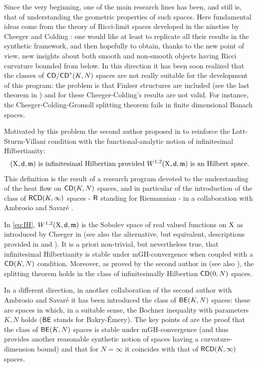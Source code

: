 \documentclass[reqno,11pt]{article}
\numberwithin{equation}{section}
\newcommand{\mm}{{\mbox{\boldmath$m$}}}
\newcommand{\sfd}{{\sf d}}
\renewcommand{\mm}{\mathfrak m}                                %
\newcommand{\X}{{\rm X}}
\newcommand{\CD}{{\sf CD}}
\newcommand{\RCD}{{\sf RCD}}
\begin{document}
Since the very beginning, one of the main research lines has been, and still is, that of understanding the geometric properties of such spaces. Here fundamental ideas come from the theory of Ricci-limit spaces developed in the nineties by Cheeger and Colding \cite{Cheeger-Colding96,Cheeger-Colding97I,Cheeger-Colding97II,Cheeger-Colding97III,Colding97}: one would like at least to replicate all their results in the synthetic framework, and then hopefully to obtain, thanks to the new point of view, new insights about both  smooth and non-smooth objects having Ricci curvature bounded from below. In this direction it has been soon realized that the classes of $\CD/\CD^*(K,N)$ spaces are not really suitable for the development of this program: the problem is that Finlser structures are included (see the last theorem in \cite{Villani09}) and for these  Cheeger-Colding's results are not valid. For instance, the Cheeger-Colding-Gromoll splitting theorem fails in finite dimensional Banach spaces. 

Motivated by this problem  the second author proposed in \cite{Gigli12} to reinforce the Lott-Sturm-Villani condition with the functional-analytic notion of infinitesimal Hilbertianity:
\begin{equation}
\label{eq:IH}
\text{$(\X,\sfd,\mm)$ is infinitesimal Hilbertian provided $W^{1,2}(\X,\sfd,\mm)$ is an Hilbert space.}
\end{equation}
This definition is the result of a research program devoted to the understanding of the heat flow \cite{Gigli10,Gigli-Kuwada-Ohta10,AmbrosioGigliSavare11} on $\CD(K,N)$ spaces, and in particular of the introduction of the class of $\RCD(K,\infty)$ spaces  - ${\sf R}$ standing for Riemannian - in a collaboration with Ambrosio and Savar\'e \cite{AmbrosioGigliSavare11-2}. 

In \eqref{eq:IH}, $W^{1,2}(\X,\sfd,\mm)$ is the Sobolev space of real valued functions on $\X$ as introduced by Cheeger in \cite{Cheeger00} (see also the alternative, but equivalent, descriptions provided in \cite{Shanmugalingam00} and \cite{AmbrosioGigliSavare11}). { It is a  priori non-trivial, but nevertheless true, that }infinitesimal Hilbertianity is stable under mGH-convergence  when coupled with a $\CD(K,N)$ condition. Moreover, as proved by the second author in  \cite{Gigli13} (see also \cite{Gigli13over}), the splitting theorem holds in the class of infinitesimally Hilbertian  $\CD(0,N)$ spaces.

In a different direction, in another collaboration \cite{AmbrosioGigliSavare12} of the second author with Ambrosio and Savar\'e it has been introduced the class of ${\sf BE}(K,N)$ spaces: these are spaces in which, in a suitable sense, the Bochner inequality with parameters $K,N$ holds (${\sf BE}$ stands for  Bakry-\'Emery). The key points  of \cite{AmbrosioGigliSavare12} are the proof that the class of ${\sf BE}(K,N)$ spaces is stable under mGH-convergence (and thus provides another reasonable synthetic notion of spaces having a curvature-dimension bound) and that for $N=\infty$ it  coincides with that of $\RCD(K,\infty)$ spaces. 
\end{document}
